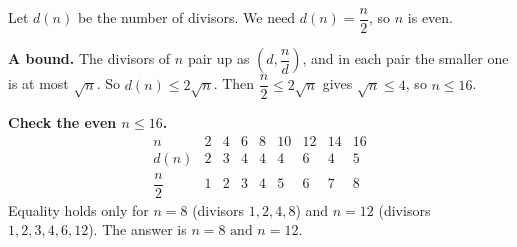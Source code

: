 Let $d(n)$ be the number of divisors. We need $d(n)=\dfrac {n}{2}$, so $n$ is even.

\textbf{A bound.} The divisors of $n$ pair up as $(d,\dfrac {n}{d})$, and in each pair the smaller one is at most $\sqrt n$. So $d(n)\le2\sqrt n$. Then $\dfrac {n}{2}\le2\sqrt n$ gives $\sqrt n\le4$, so $n\le16$.

\textbf{Check the even $n\le16$.}
\[
\begin{array}{c|cccccccc}
n&2&4&6&8&10&12&14&16\\\hline
d(n)&2&3&4&4&4&6&4&5\\
\dfrac {n}{2}&1&2&3&4&5&6&7&8
\end{array}
\]
Equality holds only for $n=8$ (divisors $1,2,4,8$) and $n=12$ (divisors $1,2,3,4,6,12$). The answer is $\boxed{n=8\text{ and }n=12}$.
